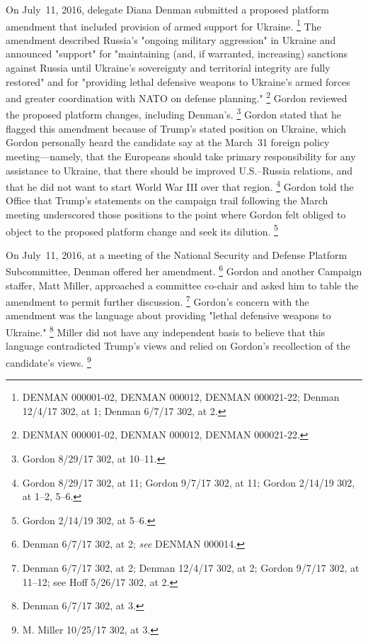 On July~11, 2016, delegate Diana Denman submitted a proposed platform amendment that included provision of armed support for Ukraine.%
\footnote{DENMAN 000001-02, DENMAN 000012, DENMAN 000021-22;
Denman 12/4/17 302, at 1;
Denman 6/7/17 302, at 2.}
The amendment described Russia's "ongoing military aggression" in Ukraine and announced "support" for "maintaining (and, if warranted, increasing) sanctions against Russia until Ukraine's sovereignty and territorial integrity are fully restored" and for "providing lethal defensive weapons to Ukraine's armed forces and greater coordination with NATO on defense planning."%
\footnote{DENMAN 000001-02, DENMAN 000012, DENMAN 000021-22.}
Gordon reviewed the proposed platform changes, including Denman's.%
\footnote{Gordon 8/29/17 302, at 10--11.}
Gordon stated that he flagged this amendment because of Trump's stated position on Ukraine, which Gordon personally heard the candidate say at the March~31 foreign policy meeting---namely, that the Europeans should take primary responsibility for any assistance to Ukraine, that there should be improved U.S.--Russia relations, and that he did not want to start World War III over that region.%
\footnote{Gordon 8/29/17 302, at 11;
Gordon 9/7/17 302, at 11;
Gordon 2/14/19 302, at 1--2, 5--6.}
Gordon told the Office that Trump's statements on the campaign trail following the March meeting underscored those positions to the point where Gordon felt obliged to object to the proposed platform change and seek its dilution.%
\footnote{Gordon 2/14/19 302, at 5--6.}

On July~11, 2016, at a meeting of the National Security and Defense Platform Subcommittee, Denman offered her amendment.%
\footnote{Denman 6/7/17 302, at 2;
\textit{see} DENMAN 000014.}
Gordon and another Campaign staffer, Matt Miller, approached a committee co-chair and asked him to table the amendment to permit further discussion.%
\footnote{Denman 6/7/17 302, at 2;
Denman 12/4/17 302, at 2;
Gordon 9/7/17 302, at 11--12;
see Hoff 5/26/17 302, at 2.}
Gordon's concern with the amendment was the language about providing "lethal defensive weapons to Ukraine."%
\footnote{Denman 6/7/17 302, at 3.}
Miller did not have any independent basis to believe that this language contradicted Trump's views and relied on Gordon's recollection of the candidate's views.%
\footnote{M. Miller 10/25/17 302, at 3.}


